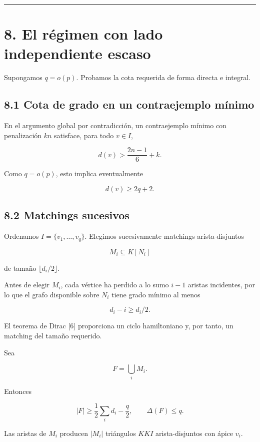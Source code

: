 \documentclass[spanish,11pt,a4paper]{article}
\begin{document}
\begin{center}\rule{0.5\linewidth}{0.5pt}\end{center}

\section{8. El régimen con lado independiente
escaso}\label{el-ruxe9gimen-con-lado-independiente-escaso}

Supongamos \(q=o(p)\). Probamos la cota requerida de forma directa e
integral.

\subsection{8.1 Cota de grado en un contraejemplo
mínimo}\label{cota-de-grado-en-un-contraejemplo-muxednimo}

En el argumento global por contradicción, un contraejemplo mínimo con
penalización \(kn\) satisface, para todo \(v\in I\),

\[
d(v)>
\frac{2n-1}{6}+k.
\tag{8.1}
\]

Como \(q=o(p)\), esto implica eventualmente

\[
d(v)\ge2q+2.
\tag{8.2}
\]

\subsection{8.2 Matchings sucesivos}\label{matchings-sucesivos}

Ordenamos \(I=\{v_1,\ldots,v_q\}\). Elegimos sucesivamente matchings
arista-disjuntos

\[
M_i\subseteq K[N_i]
\]

de tamaño \(\lfloor d_i/2\rfloor\).

Antes de elegir \(M_i\), cada vértice ha perdido a lo sumo \(i-1\)
aristas incidentes, por lo que el grafo disponible sobre \(N_i\) tiene
grado mínimo al menos

\[
d_i-i\ge d_i/2.
\]

El teorema de Dirac {[}6{]} proporciona un ciclo hamiltoniano y, por
tanto, un matching del tamaño requerido.

Sea

\[
F=\bigcup_iM_i.
\]

Entonces

\[
|F|
\ge
\frac12\sum_i d_i-\frac q2,
\qquad
\Delta(F)\le q.
\tag{8.3}
\]

Las aristas de \(M_i\) producen \(|M_i|\) triángulos \(KKI\)
arista-disjuntos con ápice \(v_i\).
\end{document}
